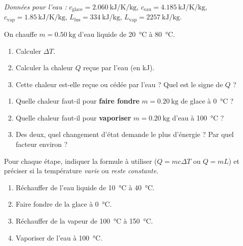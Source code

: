 \documentclass[11pt,a4paper]{article}
\begin{document}
\begin{center}
\end{center}

\textit{Données pour l'eau :} $c_{\text{glace}}=\SI{2.060}{\kilo\joule\per\kelvin\per\kilogram}$,\;
$c_{\text{eau}}=\SI{4.185}{\kilo\joule\per\kelvin\per\kilogram}$,\;
$c_{\text{vap}}=\SI{1.85}{\kilo\joule\per\kelvin\per\kilogram}$,\;
$L_{\text{fus}}=\SI{334}{\kilo\joule\per\kilogram}$,\; $L_{\text{vap}}=\SI{2257}{\kilo\joule\per\kilogram}$.

\begin{exercice}
On chauffe $m=\SI{0.50}{\kilogram}$ d'eau liquide de \SI{20}{\celsius} à \SI{80}{\celsius}.
\begin{enumerate}[label=\alph*),leftmargin=2em,topsep=2pt,itemsep=2pt]
  \item Calculer $\Delta T$.
  \item Calculer la chaleur $Q$ reçue par l'eau (en \si{\kilo\joule}).
  \item Cette chaleur est-elle reçue ou cédée par l'eau ? Quel est le signe de $Q$ ?
\end{enumerate}
\end{exercice}

\begin{exercice}
\begin{enumerate}[label=\alph*),leftmargin=2em,topsep=2pt,itemsep=2pt]
  \item Quelle chaleur faut-il pour \textbf{faire fondre} $m=\SI{0.20}{\kilogram}$ de glace à \SI{0}{\celsius} ?
  \item Quelle chaleur faut-il pour \textbf{vaporiser} $m=\SI{0.20}{\kilogram}$ d'eau à \SI{100}{\celsius} ?
  \item Des deux, quel changement d'état demande le plus d'énergie ? Par quel facteur environ ?
\end{enumerate}
\end{exercice}

\begin{exercice}
Pour chaque étape, indiquer la formule à utiliser ($Q=mc\Delta T$ ou $Q=mL$) et préciser si la
température \emph{varie} ou \emph{reste constante}.
\begin{enumerate}[label=\alph*),leftmargin=2em,topsep=2pt,itemsep=2pt]
  \item Réchauffer de l'eau liquide de \SI{10}{\celsius} à \SI{40}{\celsius}.
  \item Faire fondre de la glace à \SI{0}{\celsius}.
  \item Réchauffer de la vapeur de \SI{100}{\celsius} à \SI{150}{\celsius}.
  \item Vaporiser de l'eau à \SI{100}{\celsius}.
\end{enumerate}
\end{exercice}
\end{document}
